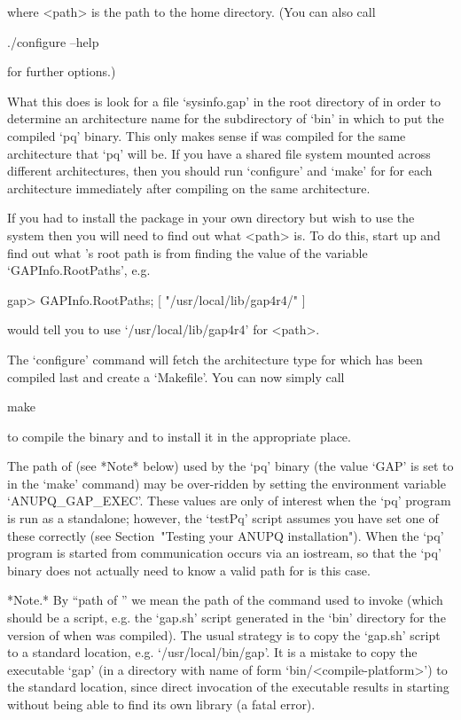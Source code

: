 where <path> is the path to the {\GAP} home directory. (You can also call

\begintt
./configure --help
\endtt

for further options.)

What this does is look for a file `sysinfo.gap' in the root directory  of
{\GAP} in order to determine an architecture name for the subdirectory of
`bin' in which to put the compiled `pq' binary. This only makes sense  if
{\GAP} was compiled for the same architecture that `pq' will be.  If  you
have a shared file system mounted across  different  architectures,  then
you should run `configure' and `make' for {\ANUPQ} for each  architecture
immediately after compiling {\GAP} on the same architecture.

If you had to install the package in your own directory but wish  to  use
the system {\GAP} then you will need to find out what <path> is. To  do
this, start up {\GAP} and find  out  what  {\GAP}'s  root  path  is  from
finding the value of the  variable  `GAPInfo.RootPaths', e.g.

\begintt
gap> GAPInfo.RootPaths;
[ "/usr/local/lib/gap4r4/" ]
\endtt

would tell you to use `/usr/local/lib/gap4r4' for <path>.

The `configure' command will fetch the architecture type for which {\GAP}
has been compiled  last and  create  a  `Makefile'. You  can  now
simply call

\begintt
make
\endtt

to compile the binary and to install it in the appropriate place.

The path of {\GAP} (see *Note* below) used by the `pq' binary (the  value
`GAP' is set to in the `make' command) may be over-ridden by setting  the
environment variable `ANUPQ_GAP_EXEC'. These values are only of  interest
when the `pq' program is run  as  a  standalone;  however,  the  `testPq'
script assumes you have set one of these correctly (see  Section~"Testing
your ANUPQ installation"). When the `pq' program is started  from  {\GAP}
communication occurs via an iostream, so that the `pq'  binary  does  not
actually need to know a valid path for {\GAP} is this case.

*Note.* By ``path of {\GAP}'' we mean the path of  the  command  used  to
invoke {\GAP} (which  should  be  a  script,  e.g.  the  `gap.sh'  script
generated in the `bin' directory for the version of  {\GAP}  when  {\GAP}
was compiled). The usual strategy is to copy the  `gap.sh'  script  to  a
standard location, e.g. `/usr/local/bin/gap'. It is a mistake to copy the
{\GAP}  executable  `gap'   (in   a   directory   with   name   of   form
`bin/<compile-platform>')  to  the  standard   location,   since   direct
invocation of the executable results in  {\GAP}  starting  without  being
able to find its own library (a fatal error).

